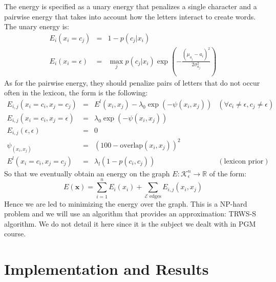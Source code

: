 \documentclass[10pt,a4paper]{article}
\begin{document}
The energy is specified as a unary energy that penalizes a single character and a pairwise energy that takes into account how the letters interact to create words. The unary energy is: 
\begin{equation}
\begin{array}{rll}
E_i(x_i = c_j) & = & \displaystyle 1 - p(c_j|x_i) \\
E_i(x_i = \epsilon)	& = & \displaystyle \max_j p(c_j |x_i) \exp\left( - \frac{(\mu_{a_j} - a_i)^2}{2\sigma^2_{a_j}} \right)
\end{array}
\label{eq:}
\end{equation}
As for the pairwise energy, they should penalize pairs of letters that do not occur often in the lexicon, the form is the following:
\begin{equation}
\begin{array}{rlll}
E_{i,j}(x_i = c_i,x_j = c_j) 			& = & \displaystyle E^l(x_i,x_j) - \lambda_0\exp\left( - \psi(x_i,x_j) \right) 	& (\forall c_i \neq \epsilon, c_j \neq \epsilon) \\
E_{i,j}(x_i = c_i,x_j = \epsilon) & = & \displaystyle \lambda_0\exp\left( - \psi(x_i,x_j) \right) 								& \\
E_{i,j}(\epsilon, \epsilon) 			& = & \displaystyle 0 																													& \\
\psi_(x_i,x_j) 										& = & \displaystyle (100 - \text{overlap}(x_i,x_j))^2 													& \\
E^l(x_i = c_i,x_j = c_j)					& = & \displaystyle \lambda_l(1 - p(c_i,c_j)) 																	& (\text{lexicon prior})
\end{array}
\label{eq:pairwiseEnergy}
\end{equation}
So that we eventually obtain an energy on the graph $E:\mathcal{K}_{\epsilon}^n \rightarrow \mathbb{R}$ of the form:
\begin{equation}
E(\mathbf{x})	= \sum_{i=1}^n E_i(x_i) + \sum_{\mathcal{E} \text{ edges}} E_{i,j}(x_i,x_j)
\label{eq:}
\end{equation}
Hence we are led to minimizing the energy over the graph. This is a NP-hard problem and we will use an algorithm that provides an approximation: TRWS-S algorithm. We do not detail it here since it is the subject we dealt with in PGM course.





\section{Implementation and Results}
\end{document}
